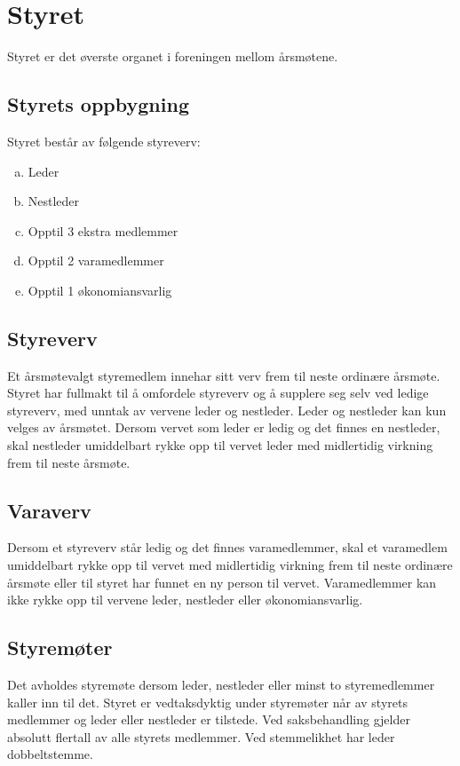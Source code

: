 \chapter{Styret}
Styret er det øverste organet i foreningen mellom årsmøtene.

\section{Styrets oppbygning}
Styret består av følgende styreverv:
\begin{enumerate}[a.]
    \item Leder
    \item Nestleder
    \item Opptil 3 ekstra medlemmer
    \item Opptil 2 varamedlemmer
    \item Opptil 1 økonomiansvarlig
\end{enumerate}

\section{Styreverv}
Et årsmøtevalgt styremedlem innehar sitt verv frem til neste ordinære årsmøte. Styret har fullmakt til å omfordele styreverv og å supplere seg selv ved ledige styreverv, med unntak av vervene leder og nestleder. Leder og nestleder kan kun velges av årsmøtet. Dersom vervet som leder er ledig og det finnes en nestleder, skal nestleder umiddelbart rykke opp til vervet leder med midlertidig virkning frem til neste årsmøte.

\section{Varaverv}
Dersom et styreverv står ledig og det finnes varamedlemmer, skal et varamedlem umiddelbart rykke opp til vervet med midlertidig virkning frem til neste ordinære årsmøte eller til styret har funnet en ny person til vervet. Varamedlemmer kan ikke rykke opp til vervene leder, nestleder eller økonomiansvarlig.

\section{Styremøter}
Det avholdes styremøte dersom leder, nestleder eller minst to styremedlemmer kaller inn til det. Styret er vedtaksdyktig under styremøter når  av styrets medlemmer og leder eller nestleder er tilstede. Ved saksbehandling gjelder absolutt flertall av alle styrets medlemmer. Ved stemmelikhet har leder dobbeltstemme.

